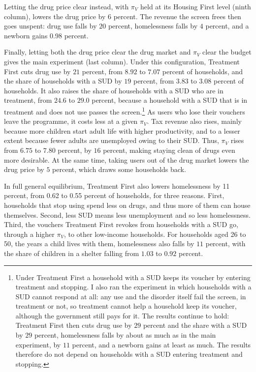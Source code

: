 \documentclass[10pt]{article}
\begin{document}
Letting the drug price clear instead, with $\pi_V$ held at its Housing First level (ninth column), lowers the drug price by $6$ percent. The revenue the screen frees then goes unspent: drug use falls by $20$ percent, homelessness falls by $4$ percent, and a newborn gains $0.98$ percent.

Finally, letting both the drug price clear the drug market and $\pi_V$ clear the budget gives the main experiment (last column). Under this configuration, Treatment First cuts drug use by $21$ percent,
from $8.92$ to $7.07$ percent of households, and the share of households with
a SUD by $19$ percent, from $3.83$ to $3.08$ percent of
households. It also raises the share of households with a SUD who are in treatment, from $24.6$ to $29.0$ percent, because a household with a SUD that is in treatment and does not use passes the screen.\footnote{Under Treatment First a household with a SUD keeps its voucher by entering treatment and stopping. I also ran the experiment in which households with a SUD cannot respond at all: any use and the disorder itself fail the screen, in treatment or not, so treatment cannot help a household keep its voucher, although the government still pays for it. The results continue to hold: Treatment First then cuts drug use by $29$ percent and the share with a SUD by $29$ percent, homelessness falls by about as much as in the main experiment, by $11$ percent, and a newborn gains at least as much. The results therefore do not depend on households with a SUD entering treatment and stopping.} As users who lose their vouchers leave the programme, it costs
less at a given $\pi_V$. Tax revenue also rises, mainly because more children start adult life with higher productivity, and to a lesser extent because fewer adults are unemployed owing to their SUD. Thus, $\pi_V$ rises from $6.75$ to
$7.80$ percent, by $16$ percent, making staying clean of drugs even more desirable. At the same time, taking users out of the drug market lowers the drug price by
$5$ percent, which draws some households back.

In full general equilibrium, Treatment First also lowers homelessness by 11 percent, from 0.62 to 0.55 percent of households, for three reasons. First, households that stop using spend less on drugs, and thus more of them can house themselves. Second, less SUD means less unemployment and so less homelessness. Third, the vouchers Treatment First revokes from households with a SUD go, through a higher $\pi_V$, to other low-income households. For households aged 26 to 50, the years a child lives with them, homelessness also falls by $11$ percent, with the share of children in a shelter falling from $1.03$ to $0.92$ percent.
\end{document}

